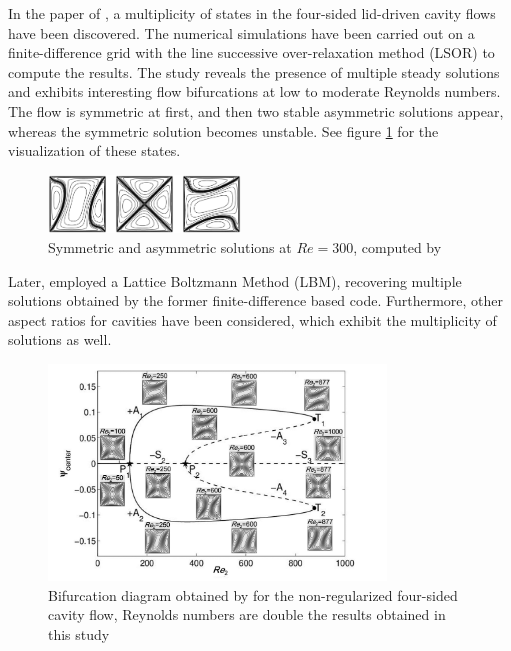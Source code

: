 In the paper of \cite{wahba2009}, a multiplicity of states in the four-sided
lid-driven cavity flows have been discovered. The numerical simulations have
been carried out on a finite-difference grid with the line successive
over-relaxation method (LSOR) to compute the results. The study reveals the
presence of multiple steady solutions and exhibits interesting flow
bifurcations at low to moderate Reynolds numbers. The flow is symmetric at
first, and then two stable asymmetric solutions appear, whereas the symmetric
solution becomes unstable. See figure \ref{fig:4fsc_states} for the
visualization of these states.

\begin{figure}[ht]
  \centering
  \includegraphics[width=0.455\textwidth]{figs/fig_wahba2009}
  \caption{Symmetric and asymmetric solutions at $Re=300$, computed by
    \cite{wahba2009}}
  \label{fig:4fsc_states}
\end{figure}

Later, \cite{perumal2011} employed a Lattice Boltzmann Method (LBM), recovering
multiple solutions obtained by the former finite-difference based code.
Furthermore, other aspect ratios for cavities have been considered, which
exhibit the multiplicity of solutions as well. 

\begin{figure}[ht]
  \centering
  \includegraphics[width=0.8\textwidth]{figs/fig2_chen2013.png}
  \caption{Bifurcation diagram obtained by \cite{chen2013} for the
    non-regularized four-sided cavity flow, Reynolds numbers are 
    double the results obtained in this study} 
  \label{fig:bif_diag_chen}
\end{figure}

